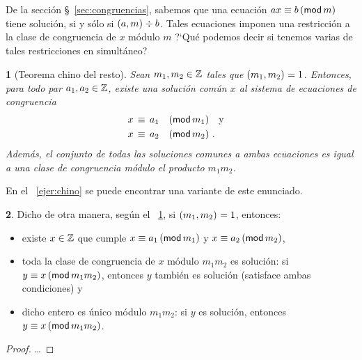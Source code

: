 \theoremstyle{plain}
\newtheorem{teoChino}{\teoname}[section]
\newtheorem{coroChino}[teoChino]{\coroname}

\theoremstyle{definition}
\newtheorem{obsChino}[teoChino]{\obsname}


De la secci\'on \S~\ref{sec:congruencias}, sabemos que una ecuaci\'on
$ax\equiv b\tmodulo[m]$ tiene soluci\'on, si y s\'olo si
$\mcd{a,m}\div b$. Tales ecuaciones imponen una restricci\'on a la clase
de congruencia de $x$ m\'odulo $m$ ?`Qu\'e podemos decir si tenemos varias
de tales restricciones en simult\'aneo?

\begin{teoChino}[Teorema chino del resto]
	\label{teo:chino}
	Sean $m_1,m_2\in\Enteros$ tales que $\mcd{m_1,m_2}=1$.
	Entonces, para todo par $a_1,a_2\in\Enteros$, existe una
	soluci\'on com\'un $x$ al sistema de ecuaciones de congruencia
	\begin{displaymath}
		\begin{aligned}
			x & \,\equiv\,a_1\modulo[m_1] \dispand \\
			x & \,\equiv\,a_2\modulo[m_2] \dispstop
		\end{aligned}
	\end{displaymath}
	Adem\'as, el conjunto de todas las soluciones comunes a ambas
	ecuaciones es igual a una clase de congruencia m\'odulo el
	producto $m_1m_2$.
\end{teoChino}

En el \ejername~\ref{ejer:chino} se puede encontrar una variante de
este enunciado.

\begin{obsChino}\label{obs:chino}
	Dicho de otra manera, seg\'un el \teoname~\ref{teo:chino},
	si $\mcd{m_1,m_2}=1$, entonces:
	\begin{itemize}
		\item existe $x\in\Enteros$ que cumple
			$x\equiv a_1\tmodulo[m_1]$ y
			$x\equiv a_2\tmodulo[m_2]$,
		\item toda la clase de congruencia de $x$ m\'odulo
			$m_1m_2$ es soluci\'on:
			si $y\equiv x\tmodulo[m_1m_2]$, entonces
			$y$ tambi\'en es soluci\'on (satisface ambas
			condiciones) y
		\item dicho entero es \'unico m\'odulo $m_1m_2$:
			si $y$ es soluci\'on, entonces
			$y\equiv x\tmodulo[m_1m_2]$.
	\end{itemize}
\end{obsChino}

\begin{proof}
	\dots
\end{proof}

